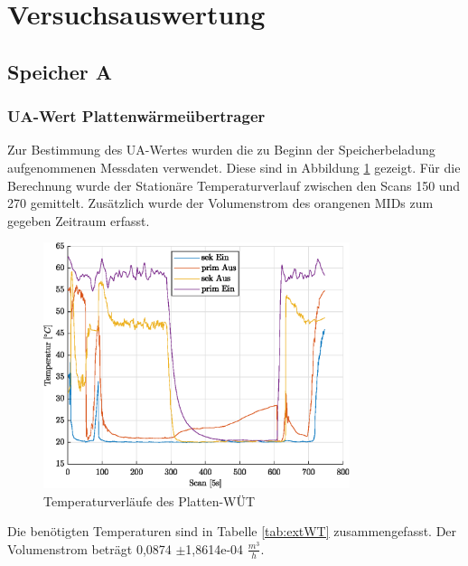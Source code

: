 \section{Versuchsauswertung}

\subsection{Speicher A}

\subsubsection{UA-Wert Plattenwärmeübertrager}
Zur Bestimmung des UA-Wertes wurden die zu Beginn der Speicherbeladung aufgenommenen Messdaten verwendet. Diese sind in Abbildung \ref{fig:extWT} gezeigt. Für die Berechnung wurde der Stationäre Temperaturverlauf zwischen den Scans 150 und 270 gemittelt. Zusätzlich wurde der Volumenstrom des orangenen MIDs zum gegeben Zeitraum erfasst. 

\begin{figure}[H]
	\centering
	\includegraphics[width=0.8\textwidth]{../DATA/PlattenWT_A.eps}
	\caption[Temperaturverläufe des Platten-WÜT]{Temperaturverläufe des Platten-WÜT}
	\label{fig:extWT}
\end{figure}

Die benötigten Temperaturen sind in Tabelle \ref{tab:extWT} zusammengefasst. Der Volumenstrom beträgt 0,0874 $\pm$1,8614e-04 $\frac{m^3}{h}$.

